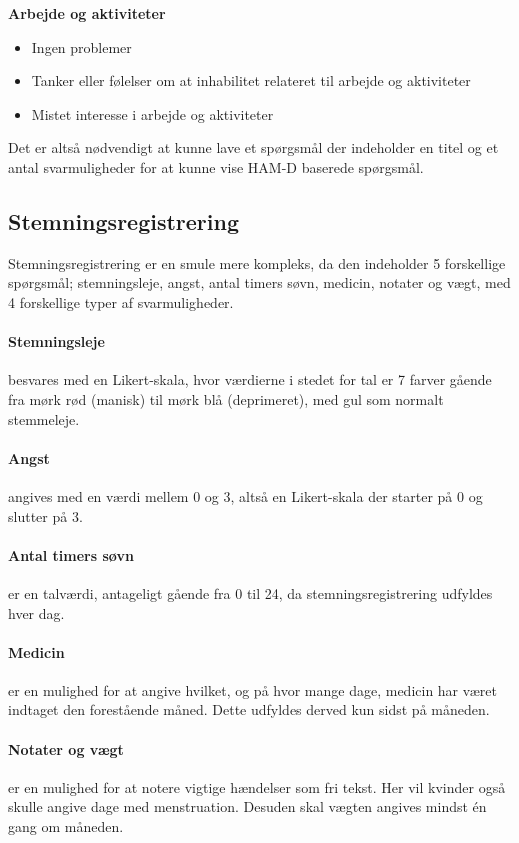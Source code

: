\textbf{Arbejde og aktiviteter}
\begin{itemize}
\item Ingen problemer
\item Tanker eller følelser om at inhabilitet relateret til arbejde og aktiviteter
\item Mistet interesse i arbejde og aktiviteter 
\end{itemize}

Det er altså nødvendigt at kunne lave et spørgsmål der indeholder en titel og et antal svarmuligheder for at kunne vise HAM-D baserede spørgsmål.

\subsection{Stemningsregistrering} 
Stemningsregistrering er en smule mere kompleks, da den indeholder 5 forskellige spørgsmål; stemningsleje, angst, antal timers søvn, medicin, notater og vægt, med 4 forskellige typer af svarmuligheder.

\paragraph{Stemningsleje} besvares med en Likert-skala, hvor værdierne i stedet for tal er 7 farver gående fra mørk rød (manisk) til mørk blå (deprimeret), med gul som normalt stemmeleje.

\paragraph{Angst} angives med en værdi mellem 0 og 3, altså en Likert-skala der starter på 0 og slutter på 3.

\paragraph{Antal timers søvn} er en talværdi, antageligt gående fra 0 til 24, da stemningsregistrering udfyldes hver dag.

\paragraph{Medicin} er en mulighed for at angive hvilket, og på hvor mange dage, medicin har været indtaget den forestående måned.
Dette udfyldes derved kun sidst på måneden.

\paragraph{Notater og vægt} er en mulighed for at notere vigtige hændelser som fri tekst.
Her vil kvinder også skulle angive dage med menstruation.
Desuden skal vægten angives mindst én gang om måneden.

